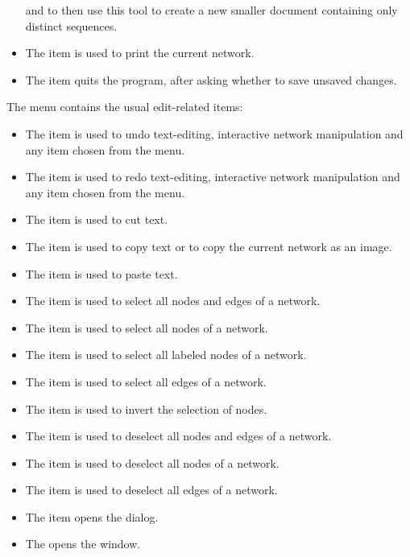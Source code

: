 \documentclass[11pt]{article}
\begin{document}
\begin{itemize}
and to then use this tool to create a new smaller document containing only distinct sequences.
\item
The  item is used to print the current network.
\item
The  item quits the program, after asking whether
to save unsaved changes.
\end{itemize}


The  menu contains the usual edit-related items:
\begin{itemize}
\item The  item is used to undo text-editing,
interactive network manipulation and any item chosen from the 
menu.
\item The  item is used to redo text-editing,
interactive network manipulation and any item chosen from the 
menu.
\item The  item is used to cut text.
\item The  item is used to copy text or to copy
the current network as an image.
\item The  item is used to paste text.
\item The  item is used to select all nodes and edges
of a network.
\item The  item is used to select all nodes
of a network.
\item The  item is used to select all labeled nodes
of a network.
\item The  item is used to select all edges
of a network.
\item The  item is used to invert the selection
of nodes.
\item The  item is used to deselect all nodes and edges
of a network.
\item The  item is used to deselect all nodes
of a network.
\item The  item is used to deselect all edges
of a network.
\item The  item opens the
 dialog.
\item The  opens the 
window.
\end{itemize}
\end{document}
